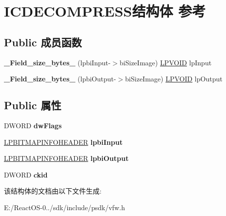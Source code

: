 \hypertarget{struct_i_c_d_e_c_o_m_p_r_e_s_s}{}\section{I\+C\+D\+E\+C\+O\+M\+P\+R\+E\+S\+S结构体 参考}
\label{struct_i_c_d_e_c_o_m_p_r_e_s_s}
\subsection*{Public 成员函数}
\begin{DoxyCompactItemize}
\item 
\mbox{\label{struct_i_c_d_e_c_o_m_p_r_e_s_s_a6fb0c807d25f06997f5b9bfe58d7edc8}} 
{\bfseries \+\_\+\+Field\+\_\+size\+\_\+bytes\+\_\+} (lpbi\+Input-\/$>$bi\+Size\+Image) \hyperlink{interfacevoid}{L\+P\+V\+O\+ID} lp\+Input
\item 
\mbox{\label{struct_i_c_d_e_c_o_m_p_r_e_s_s_a6450731bcc2aaeba95eb69f5fe4ed876}} 
{\bfseries \+\_\+\+Field\+\_\+size\+\_\+bytes\+\_\+} (lpbi\+Output-\/$>$bi\+Size\+Image) \hyperlink{interfacevoid}{L\+P\+V\+O\+ID} lp\+Output
\end{DoxyCompactItemize}
\subsection*{Public 属性}
\begin{DoxyCompactItemize}
\item 
\mbox{\label{struct_i_c_d_e_c_o_m_p_r_e_s_s_a10f2ca7978125dea650a632473a1867e}} 
D\+W\+O\+RD {\bfseries dw\+Flags}
\item 
\mbox{\label{struct_i_c_d_e_c_o_m_p_r_e_s_s_a25ef37b934953fd98104c907311960a1}} 
\hyperlink{struct_b_i_t_m_a_p_i_n_f_o_h_e_a_d_e_r}{L\+P\+B\+I\+T\+M\+A\+P\+I\+N\+F\+O\+H\+E\+A\+D\+ER} {\bfseries lpbi\+Input}
\item 
\mbox{\label{struct_i_c_d_e_c_o_m_p_r_e_s_s_abb459907dce3c9cfbe5926ec53f652b5}} 
\hyperlink{struct_b_i_t_m_a_p_i_n_f_o_h_e_a_d_e_r}{L\+P\+B\+I\+T\+M\+A\+P\+I\+N\+F\+O\+H\+E\+A\+D\+ER} {\bfseries lpbi\+Output}
\item 
\mbox{\label{struct_i_c_d_e_c_o_m_p_r_e_s_s_a9f6cf44797d0ecf7ea393f4843465c46}} 
D\+W\+O\+RD {\bfseries ckid}
\end{DoxyCompactItemize}


该结构体的文档由以下文件生成\+:\begin{DoxyCompactItemize}
\item 
E\+:/\+React\+O\+S-\/0../sdk/include/psdk/vfw.\+h\end{DoxyCompactItemize}
